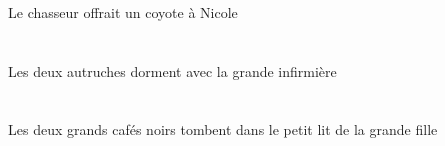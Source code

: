 \newcommand{\montrerVdPstDDu}{\strutgb{0pt}\grapho{SIHnop}}
\newcommand{\montrerVdPstDDuP}{\textipa{sepuponoba}}
\newcommand{\montrerVdPstDDuG}{\cacherGloses{Du-}montrer\cacherGloses{.VD}\cacherGloses{xPST.D}}
\newcommand{\montrerVdPstDPl}{\strutgb{0pt}\grapho{DIHnop}}
\newcommand{\montrerVdPstDPlP}{\textipa{depuponoba}}
\newcommand{\montrerVdPstDPlG}{\cacherGloses{Pl-}montrer\cacherGloses{.VD}\cacherGloses{xPST.D}}
\begin{exe}
\ex\glll
   \DEFSgErg{}   \chasseurCSgErg{}    \INDSgDat{}   \NicoleBSgDat{}   \INDSgAbs{}   \coyoteCSgAbs{}  \offrirVdPstCSg{} \\
   \DEFSgErgP{}   \chasseurCSgErgP{}    \INDSgDatP{}   \NicoleBSgDatP{}   \INDSgAbsP{}   \coyoteCSgAbsP{}  \offrirVdPstCSgP{} \\
   \DEFSgErgG{}   \chasseurCSgErgG{}    \INDSgDatG{}   \NicoleBSgDatG{}   \INDSgAbsG{}   \coyoteCSgAbsG{}  \offrirVdPstCSgG{} \\
 Le chasseur offrait un coyote à Nicole
\ex\glll
   \DEFDuAbs{}   \autrucheBDuAbs{}    \DEFSgObl{}   \grandASg{}   \infirmiereASgObl{}   \AVEC{}  \dormirViPrsBDu{} \\
   \DEFDuAbsP{}   \autrucheBDuAbsP{}    \DEFSgOblP{}   \grandASgP{}   \infirmiereASgOblP{}   \AVECP{}  \dormirViPrsBDuP{} \\
   \DEFDuAbsG{}   \autrucheBDuAbsG{}    \DEFSgOblG{}   \grandASgG{}   \infirmiereASgOblG{}   \AVECG{}  \dormirViPrsBDuG{} \\
 Les deux autruches dorment avec la grande infirmière
\ex\glll
   \DEFDuAbs{}   \grandCDu{}   \noirCDu{}   \cafeCDuAbs{}    \DEFSgObl{}    \DEFSgObl{}   \grandCSg{}   \filleCSgObl{}   \DE{}   \petitDSg{}   \litDSgObl{}   \DANS{}  \tomberViPrsCDu{} \\
   \DEFDuAbsP{}   \grandCDuP{}   \noirCDuP{}   \cafeCDuAbsP{}    \DEFSgOblP{}    \DEFSgOblP{}   \grandCSgP{}   \filleCSgOblP{}   \DEP{}   \petitDSgP{}   \litDSgOblP{}   \DANSP{}  \tomberViPrsCDuP{} \\
   \DEFDuAbsG{}   \grandCDuG{}   \noirCDuG{}   \cafeCDuAbsG{}    \DEFSgOblG{}    \DEFSgOblG{}   \grandCSgG{}   \filleCSgOblG{}   \DEG{}   \petitDSgG{}   \litDSgOblG{}   \DANSG{}  \tomberViPrsCDuG{} \\
 Les deux grands cafés noirs tombent dans le petit lit de la grande fille
\ex\glll
   \INDSgErg{}   \grosCSg{}   \blancCSg{}   \chasseurCSgErg{}   \INDPlAbs{}   \noirCPl{}   \cafeCPlAbs{}  \acheterVtPrsCPl{} \\
   \INDSgErgP{}   \grosCSgP{}   \blancCSgP{}   \chasseurCSgErgP{}   \INDPlAbsP{}   \noirCPlP{}   \cafeCPlAbsP{}  \acheterVtPrsCPlP{} \\

\end{exe}
